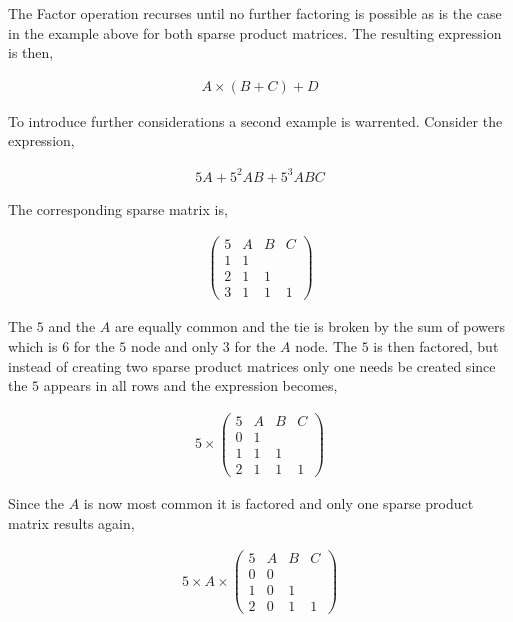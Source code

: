 The Factor operation recurses until no further factoring is possible as is the case in the example above for both sparse product matrices. The resulting expression is then,

\begin{align*}
A \times (B + C) + D
\end{align*}

To introduce further considerations a second example is warrented. Consider the expression,

\begin{align*}
5A + 5^2AB + 5^3ABC
\end{align*}

The corresponding sparse matrix is,

\begin{align*}
\begin{pmatrix}5 & A & B & C\\
               1 & 1 &   &  \\
               2 & 1 & 1 &  \\
               3 & 1 & 1 & 1\end{pmatrix}
\end{align*}

The $5$ and the $A$ are equally common and the tie is broken by the sum of powers which is $6$ for the $5$ node and only $3$ for the $A$ node. The $5$ is then factored, but instead of creating two sparse product matrices only one needs be created since the $5$ appears in all rows and the expression becomes,

\begin{align*}
5 \times \begin{pmatrix}5 & A & B & C\\
                        0 & 1 &   &  \\
                        1 & 1 & 1 &  \\
                        2 & 1 & 1 & 1\end{pmatrix}
\end{align*}

Since the $A$ is now most common it is factored and only one sparse product matrix results again,

\begin{align*}
5 \times A \times \begin{pmatrix}5 & A & B & C\\
                                 0 & 0 &   &  \\
                                 1 & 0 & 1 &  \\
                                 2 & 0 & 1 & 1\end{pmatrix}
\end{align*}

